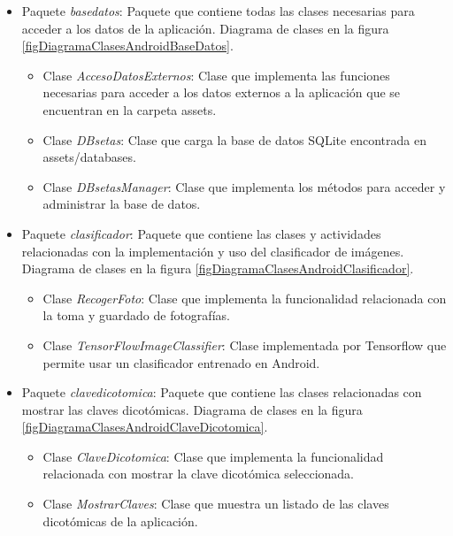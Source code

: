 \begin{itemize}

	
	\item Paquete \textit{basedatos}: Paquete que contiene todas las clases necesarias para acceder a los datos de la aplicación. Diagrama de clases en la figura \ref{figDiagramaClasesAndroidBaseDatos}.
	\begin{itemize}
		\item Clase \textit{AccesoDatosExternos}: Clase que implementa las funciones necesarias para acceder a los datos externos a la aplicación que se encuentran en la carpeta assets.
		\item Clase \textit{DBsetas}: Clase que carga la base de datos SQLite encontrada en assets/databases.
		\item Clase \textit{DBsetasManager}: Clase que implementa los métodos para acceder y administrar la base de datos.
	\end{itemize}
	
	
	\item Paquete \textit{clasificador}: Paquete que contiene las clases y actividades relacionadas con la implementación y uso del clasificador de imágenes. Diagrama de clases en la figura \ref{figDiagramaClasesAndroidClasificador}.
	\begin{itemize}
		\item Clase \textit{RecogerFoto}: Clase que implementa la funcionalidad relacionada con la toma y guardado de fotografías.
		\item Clase \textit{TensorFlowImageClassifier}: Clase implementada por Tensorflow que permite usar un clasificador entrenado en Android.
	\end{itemize}
	
	
	\item Paquete \textit{clavedicotomica}: Paquete que contiene las clases relacionadas con mostrar las claves dicotómicas. Diagrama de clases en la figura \ref{figDiagramaClasesAndroidClaveDicotomica}.
	\begin{itemize}
		\item Clase \textit{ClaveDicotomica}: Clase que implementa la funcionalidad relacionada con mostrar la clave dicotómica seleccionada.
		\item Clase \textit{MostrarClaves}: Clase que muestra un listado de las claves dicotómicas de la aplicación.
	\end{itemize}
	

\end{itemize}
